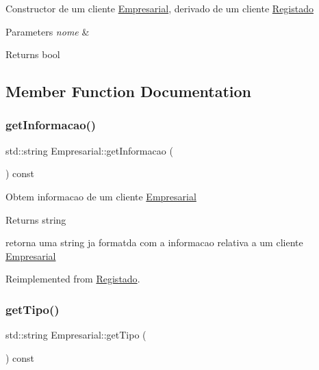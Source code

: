 Constructor de um cliente \hyperlink{class_empresarial}{Empresarial}, derivado de um cliente \hyperlink{class_registado}{Registado}


\begin{DoxyParams}{Parameters}
{\em nome} & \\
\hline
\end{DoxyParams}
\begin{DoxyReturn}{Returns}
bool 
\end{DoxyReturn}


\subsection{Member Function Documentation}
\hypertarget{class_empresarial_a28090b6b3db16b6b7ba03d6308c2c309}{}\label{class_empresarial_a28090b6b3db16b6b7ba03d6308c2c309} 
\subsubsection{\texorpdfstring{get\+Informacao()}{getInformacao()}}
{\footnotesize\ttfamily std\+::string Empresarial\+::get\+Informacao (\begin{DoxyParamCaption}{ }\end{DoxyParamCaption}) const\hspace{0.3cm}{\ttfamily [virtual]}}

Obtem informacao de um cliente \hyperlink{class_empresarial}{Empresarial}

\begin{DoxyReturn}{Returns}
string
\end{DoxyReturn}
retorna uma string ja formatda com a informacao relativa a um cliente \hyperlink{class_empresarial}{Empresarial} 

Reimplemented from \hyperlink{class_registado_a7017f0d74afd44459c3d6affcb303d52}{Registado}.

\hypertarget{class_empresarial_a3d5d89f5a446fdcca0955d289592edaf}{}\label{class_empresarial_a3d5d89f5a446fdcca0955d289592edaf} 
\subsubsection{\texorpdfstring{get\+Tipo()}{getTipo()}}
{\footnotesize\ttfamily std\+::string Empresarial\+::get\+Tipo (\begin{DoxyParamCaption}{ }\end{DoxyParamCaption}) const\hspace{0.3cm}{\ttfamily [virtual]}}

